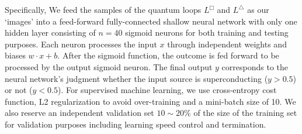 \documentclass[amsmath,amssymb, aps, prl, twocolumn]{revtex4-1}
\begin{document}
Specifically, We feed the samples of the quantum loops $L^\Box$ and $ L^\triangle$ as our `images' into a feed-forward fully-connected shallow neural network with only one hidden layer consisting of $n=40$ sigmoid neurons for both training and testing purposes. Each neuron processes the input $x$ through independent weights and biases $w\cdot x+b$. After the sigmoid function, the outcome is fed forward to be processed by the output sigmoid neuron. The final output $y$ corresponds to the neural network's judgment whether the input source is superconducting ($y>0.5$) or not ($y<0.5$).
For supervised machine learning, we use cross-entropy cost function, L2 regularization to avoid over-training and a mini-batch size of 10. We also reserve an independent validation set $10\sim 20\%$ of the size of the training set for validation purposes including learning speed control and termination\cite{MLbook}.
\end{document}
